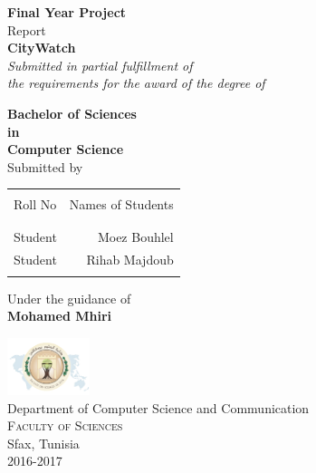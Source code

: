 \begin{titlepage}

\begin{center}

\textup{\small {\bf Final Year Project} \\ Report}\\[0.2in]

\Large \textbf {CityWatch}\\[0.5in]

       \small \emph{Submitted in partial fulfillment of\\
        the requirements for the award of the degree of}
        \vspace{.2in}

{\bf Bachelor of Sciences \\in\\ Computer Science}\\[0.5in]

\normalsize Submitted by \\
\begin{table}[h]
\centering
\begin{tabular}{lr}\hline \\
Roll No & Names of Students \\ \\ \hline
\\
Student & Moez Bouhlel \\
Student & Rihab Majdoub \\ \\ \hline
\end{tabular}
\end{table}

\vspace{.1in}
Under the guidance of\\
{\textbf{Mohamed Mhiri}}\\[0.2in]

\vfill

\includegraphics[width=0.18\textwidth]{fss-logo}\\[0.1in]
\Large{Department of Computer Science and Communication}\\
\normalsize
\textsc{Faculty of Sciences}\\
Sfax, Tunisia \\
\vspace{0.2cm}
2016-2017

\end{center}

\end{titlepage}
